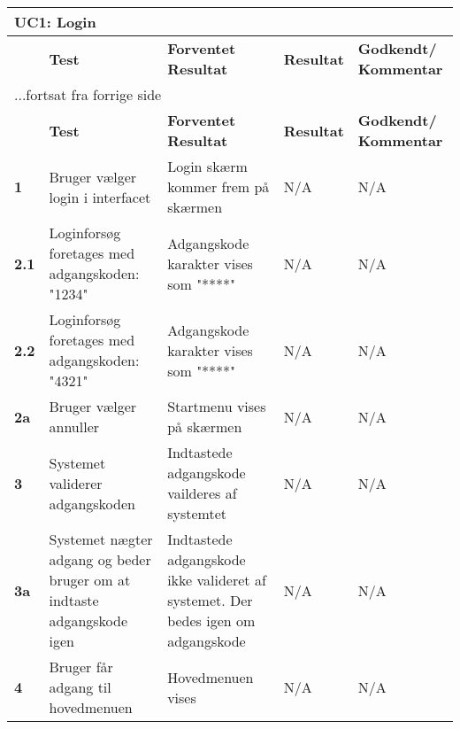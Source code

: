 
\begin{center}
\begin{longtable}{|p{}|p{}|p{}|p{}|p{}|} %
\hline
\multicolumn{5}{|l|}{\textbf{UC1: Login}} \\ \hline
\multicolumn{1}{|c|}{} &
\textbf{Test} &
\textbf{Forventet \newline Resultat} &
\textbf{Resultat} &
\textbf{Godkendt/ \newline Kommentar} \\ \hline 
\endfirsthead

\multicolumn{5}{l}{...fortsat fra forrige side} \\ \hline 
\multicolumn{1}{|c|}{} &
\textbf{Test} &
\textbf{Forventet \newline Resultat} &
\textbf{Resultat} &
\textbf{Godkendt/ \newline Kommentar} \\ \hline 
\endhead


\textbf{1}		
&Bruger vælger login i interfacet
&Login skærm kommer frem på skærmen 	
&N/A 	
&N/A \\\hline
\textbf{2.1}		
&Loginforsøg foretages med adgangskoden: "1234"	
&Adgangskode karakter vises som "****" 	
&N/A 	
&N/A \\\hline
\textbf{2.2}		
&Loginforsøg foretages med adgangskoden: "4321"	
&Adgangskode karakter vises som "****" 	
&N/A 	
&N/A \\\hline
\textbf{2a}		
&Bruger vælger annuller	
&Startmenu vises på skærmen 	
&N/A 	
&N/A \\\hline

\textbf{3}		
&Systemet validerer adgangskoden		
&Indtastede adgangskode vailderes af systemtet 	
&N/A 	
&N/A \\\hline
\textbf{3a}		
&Systemet nægter adgang og beder bruger om at indtaste adgangskode igen	
&Indtastede adgangskode ikke valideret af systemet. Der bedes igen om adgangskode	
&N/A 	
&N/A \\\hline
\textbf{4}		
&Bruger får adgang til hovedmenuen		
&Hovedmenuen vises
&N/A 	
&N/A  \\\hline
	\end{longtable}
	\label{ATUC1} 
\end{center}